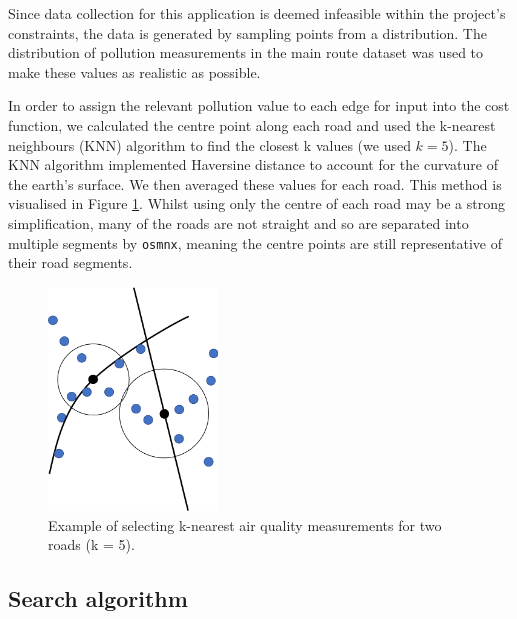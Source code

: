 \documentclass[11pt]{report}
\begin{document}
Since data collection for this application is deemed infeasible within the project's constraints, the data is generated by sampling points from a distribution. The distribution of pollution measurements in the main route dataset was used to make these values as realistic as possible.

In order to assign the relevant pollution value to each edge for input into the cost function, we calculated the centre point along each road and used the k-nearest neighbours (KNN) algorithm to find the closest k values (we used $k=5$). The KNN algorithm implemented Haversine distance to account for the curvature of the earth's surface. We then averaged these values for each road. This method is visualised in Figure \ref{fig:knn}. Whilst using only the centre of each road may be a strong simplification, many of the roads are not straight and so are separated into multiple segments by \texttt{osmnx}, meaning the centre points are still representative of their road segments.


\begin{figure}[!tb]
\centering
\includegraphics[width=0.4\textwidth]{images/knn}
\caption[K-nearest neighbours.]{Example of selecting k-nearest air quality measurements for two roads (k = 5).}
\label{fig:knn}
\end{figure}

\subsection{Search algorithm}
\end{document}

